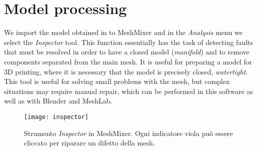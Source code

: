 \section{Model processing}
We import the model obtained in to MeshMixer and in the \emph{Analysis} menu we select the \emph{Inspector} tool. This function essentially has the task of detecting faults that must be resolved in order to have a closed model (\emph{manifold}) and to remove components separated from the main mesh. It is useful for preparing a model for 3D printing, where it is necessary that the model is precisely closed,  \emph{watertight}. This tool is useful for solving small problems with the mesh, but complex situations may require manual repair, which can be performed in this software as well as with Blender and MeshLab.

\begin{figure}[h]
\centering
\texttt{[image: inspector]}
\caption{Strumento \emph{Inspector} in MeshMixer. Ogni indicatore viola può essere cliccato per riparare un difetto della mesh.}
\label{fig:inspector}
\end{figure}

